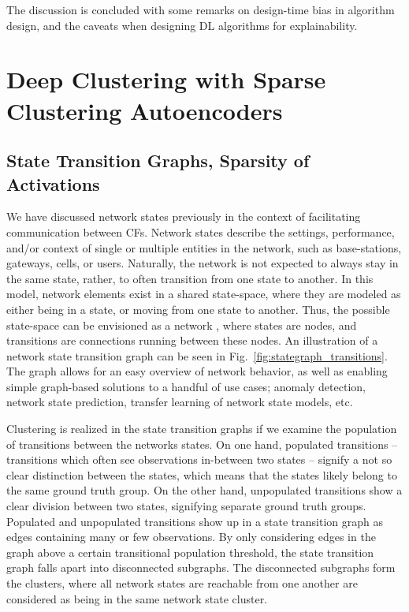 	The discussion is concluded with some remarks on design-time bias in algorithm design, and the caveats when designing \ac{DL} algorithms for explainability.

	\section{Deep Clustering with Sparse Clustering Autoencoders}
		\label{cha:sparse_clust:sec:sparse_ae}

		\subsection{State Transition Graphs, Sparsity of Activations}
			\label{cha:sparse_clust:sec:act_sparse}

			We have discussed network states previously in the context of facilitating communication between \acp{CF}.
			Network states describe the settings, performance, and/or context of single or multiple entities in the network, such as base-stations, gateways, cells, or users.
			Naturally, the network is not expected to always stay in the same state, rather, to often transition from one state to another.
			In this model, network elements exist in a shared state-space, where they are modeled as either being in a state, or moving from one state to another.
			Thus, the possible state-space can be envisioned as a network , where states are nodes, and transitions are connections running between these nodes.			
			An illustration of a network state transition graph can be seen in Fig.~\ref{fig:stategraph_transitions}.
			The graph allows for an easy overview of network behavior, as well as enabling simple graph-based solutions to a handful of use cases; anomaly detection, network state prediction, transfer learning of network state models, etc.
			
			Clustering is realized in the state transition graphs if we examine the population of transitions between the networks states.
			On one hand, populated transitions -- transitions which often see observations in-between two states -- signify a not so clear distinction between the states, which means that the states likely belong to the same ground truth group.
			On the other hand, unpopulated transitions show a clear division between two states, signifying separate ground truth groups.
			Populated and unpopulated transitions show up in a state transition graph as edges containing many or few observations.
			By only considering edges in the graph above a certain transitional population threshold, the state transition graph falls apart into disconnected subgraphs.
			The disconnected subgraphs form the clusters, where all network states are reachable from one another are considered as being in the same network state cluster.
			
